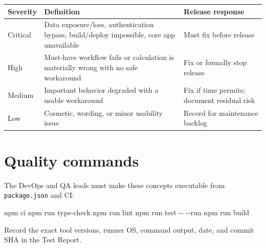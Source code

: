\documentclass[
  10pt,
  a4paper,
  oneside]{report}
\newenvironment{Shaded}{}{}
\newcommand{\NormalTok}[1]{#1}
\newcommand{\OperatorTok}[1]{\textcolor[rgb]{0.40,0.40,0.40}{#1}}
\newcounter{none} %
\begin{document}
{\def\LTcaptype{none} %
\begin{longtable}[]{@{}
  >{\raggedright\arraybackslash}p{}
  >{\raggedright\arraybackslash}p{}
  >{\raggedright\arraybackslash}p{}@{}}
\toprule\noalign{}
\begin{minipage}[b]{\linewidth}\raggedright
Severity
\end{minipage} & \begin{minipage}[b]{\linewidth}\raggedright
Definition
\end{minipage} & \begin{minipage}[b]{\linewidth}\raggedright
Release response
\end{minipage} \\
\midrule\noalign{}
\endhead
\bottomrule\noalign{}
\endlastfoot
Critical & Data exposure/loss, authentication bypass, build/deploy
impossible, core app unavailable & Must fix before release \\
High & Must-have workflow fails or calculation is materially wrong with
no safe workaround & Fix or formally stop release \\
Medium & Important behavior degraded with a usable workaround & Fix if
time permits; document residual risk \\
Low & Cosmetic, wording, or minor usability issue & Record for
maintenance backlog \\
\end{longtable}
}

\section{Quality commands}\label{166-quality-commands}

The DevOps and QA leads must make these concepts executable from
\texttt{package.json} and CI:

\begin{Shaded}
\begin{Highlighting}[]
\NormalTok{npm ci}
\NormalTok{npm run type{-}check}
\NormalTok{npm run lint}
\NormalTok{npm run test }\OperatorTok{{-}{-}} \OperatorTok{{-}{-}}\NormalTok{run}
\NormalTok{npm run build}
\end{Highlighting}
\end{Shaded}

Record the exact tool versions, runner OS, command output, date, and
commit SHA in the Test Report.
\end{document}
